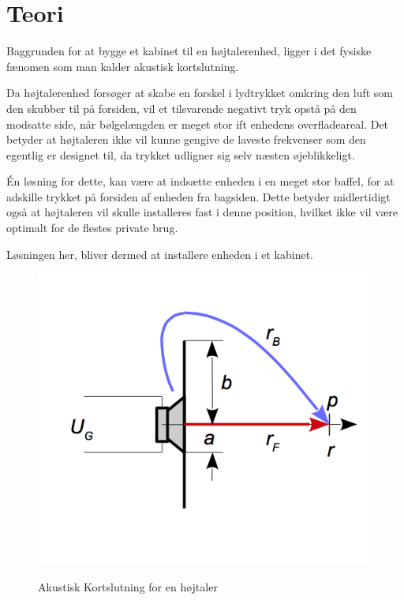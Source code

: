 \chapter{Teori}
\label{chapt:Teori}

Baggrunden for at bygge et kabinet til en højtalerenhed, ligger i det fysiske fænomen som man kalder akustisk kortslutning. 

Da højtalerenhed forsøger at skabe en forskel i lydtrykket omkring den luft som den skubber til på forsiden, vil et tilsvarende negativt tryk opstå på den modsatte side, når bølgelængden er meget stor ift enhedens overfladeareal. Det betyder at højtaleren ikke vil kunne gengive de laveste frekvenser som den egentlig er designet til, da trykket udligner sig selv næsten øjeblikkeligt. 

Én løsning for dette, kan være at indsætte enheden i en meget stor baffel, for at adskille trykket på forsiden af enheden fra bagsiden. Dette betyder midlertidigt også at højtaleren vil skulle installeres fast i denne position, hvilket ikke vil være optimalt for de flestes private brug. 

Løsningen her, bliver dermed at installere enheden i et kabinet. 



\begin{figure}[h!]
	\centering
	\includegraphics[trim={0 1.5cm 0 1cm}, clip=true,width=.4\textwidth]{Pics/kortslutning}
	\label{fig:kortslutning}
	\caption{Akustisk Kortslutning for en højtaler \cite{Elektroakustik}}
\end{figure}




